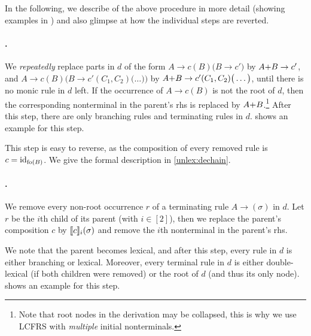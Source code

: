 \documentclass[../document.tex]{subfiles}
\begin{document}
    In the following, we describe  of the above procedure in more detail (showing examples in ) and also glimpse at how the individual steps are reverted.


    \paragraph{.}
    We \emph{repeatedly} replace parts in \(d\) of the form
    \(A \to c (B) \big( B \to c' \big) \) by \( A\text+B \to c' \), and
    \(A \to c (B) \Big( B \to c'(C_1, C_2) \big( \ldots \big) \Big) \) by \( A\text+B \to c' (C_1, C_2) \big( \ldots \big) \),
    until there is no monic rule in \(d\) left.
    If the occurrence of \(A \to c (B)\) is not the root of \(d\), then the corresponding nonterminal in the parent's rhs is replaced by \(A\text+B\).\footnote{
        Note that root nodes in the derivation may be collapsed, this is why we use LCFRS with \emph{multiple} initial nonterminals.
    }
    After this step, there are only branching rules and terminating rules in \(d\).
     shows an example for this step.

    This step is easy to reverse, as the composition of every removed rule is $c = \operatorname{id}_{\operatorname{fo}(B)}$.
    We give the formal description in \cref{unlex:dechain}.

    \paragraph{.}
    We remove every non-root occurrence $r$ of a terminating rule $A \to (\sigma)$ in $d$.
    Let $r$ be the $i$th child of its parent (with $i \in [2]$), then we replace the parent's composition $c$ by $\llbracket c\rrbracket_i(\sigma)$ and remove the $i$th nonterminal in the parent's rhs.

    We note that the parent becomes lexical, and after this step, every rule in $d$ is either branching or lexical.
    Moreover, every terminal rule in $d$ is either double-lexical (if both children were removed) or the root of \(d\) (and thus its only node).
     shows an example for this step.
\end{document}
